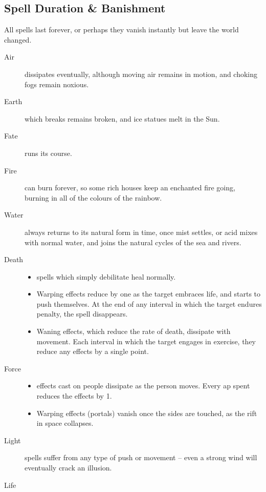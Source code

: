 \begin{multicols}{2}
\subsection{Spell Duration \& Banishment}

All spells last forever, or perhaps they vanish instantly but leave the world changed.

\begin{description}
  \item[Air]
  dissipates eventually, although moving air remains in motion, and choking fogs remain noxious.
  \item[Earth]
  which breaks remains broken, and ice statues melt in the Sun.
  \item[Fate]
  runs its course.
  \item[Fire]
  can burn forever, so some rich houses keep an enchanted fire going, burning in all of the colours of the rainbow.
  \item[Water]
  always returns to its natural form in time, once mist settles, or acid mixes with normal water, and joins the natural cycles of the sea and rivers.
  \item[Death]
  \begin{itemize}
    \item
    spells which simply debilitate heal normally.
    \item
    Warping effects reduce by one as the target embraces life, and starts to push themselves.
    At the end of any \gls{interval} in which the target endures  penalty, the spell disappears.
    \item
    Waning effects, which reduce the rate of death, dissipate with movement.
    Each \gls{interval} in which the target engages in exercise, they reduce any effects by a single point.
    \label{deathDuration}
  \end{itemize}
  \item[Force]
  \begin{itemize}
    \item
    effects cast on people dissipate as the person moves.
    Every \gls{ap} spent reduces the effects by 1.
    \item
    Warping effects (portals) vanish once the sides are touched, as the rift in space collapses.
  \end{itemize}
  \item[Light]
  spells suffer from any type of push or movement -- even a strong wind will eventually crack an illusion.
  \item[Life]

\end{description}
\end{multicols}
